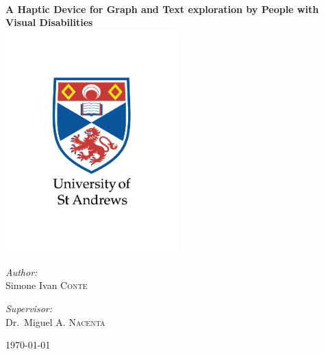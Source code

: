 
\begin{titlepage}
\begin{center}


\HRule \\[0.4cm]
{ \huge \bfseries A Haptic Device for Graph and Text exploration by People with Visual Disabilities }
\HRule \\[0.4cm]

\includegraphics[width=0.5\textwidth]{../images/St_Andrews_Logo.jpg} %

\begin{minipage}{0.4\textwidth}
\begin{flushleft} \large
\emph{Author:}\\
Simone Ivan \textsc{Conte}
\end{flushleft}
\end{minipage}
\begin{minipage}{0.4\textwidth}
\begin{flushright} \large
\emph{Supervisor:} \\
Dr.~Miguel A. \textsc{Nacenta}
\end{flushright}
\end{minipage}

\vfill

{\large \today}

\end{center}
\end{titlepage}